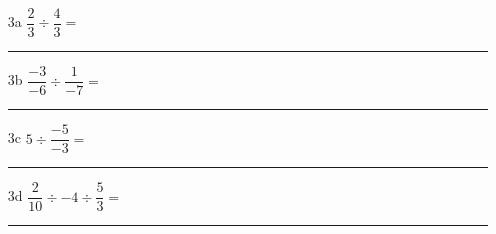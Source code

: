 \documentclass[12pt]{article}
\begin{document}
\begin{enumerate}
\item[3a] $ \dfrac{2}{3} \div \dfrac{4}{3} = $\\
  \rule{\linewidth}{0.5pt}
\item[3b] $ \dfrac{-3}{-6} \div \dfrac{1}{-7} = $\\
  \rule{\linewidth}{0.5pt}
\item[3c] $ 5 \div \dfrac{-5}{-3} = $\\
    \rule{\linewidth}{0.5pt}
\item[3d] $ \dfrac{2}{10} \div -4 \div \dfrac{5}{3} = $\\
  \rule{\linewidth}{0.5pt}
\end{enumerate}
\end{document}
